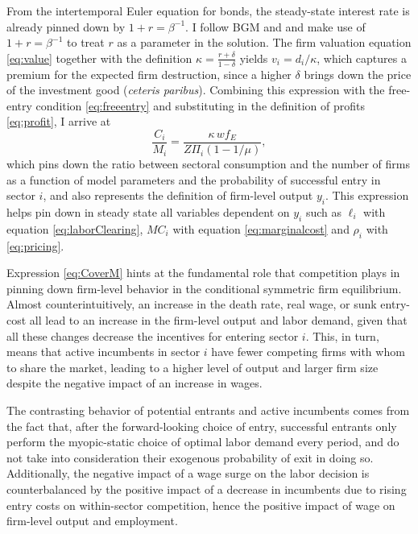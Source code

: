 \documentclass[a4paper,12pt]{article} %
\numberwithin{equation}{section} %
\numberwithin{figure}{section}
\numberwithin{table}{section}
\begin{document}
From the intertemporal Euler equation for bonds, the steady-state interest rate is already pinned down by $1+r = \beta^{-1}$. I follow 
BGM and \textcite{campbell1994inspecting} and make use of $1+r = \beta^{-1}$ to treat $r$ as a parameter in the solution. The firm valuation
equation \eqref{eq:value} together with the definition $\kappa=\frac{r+\delta}{1-\delta}$ yields $v_i = d_i/\kappa$, which captures a premium for
the expected firm destruction, since a higher $\delta$ brings down the price of the investment good (\textit{ceteris paribus}). Combining 
this expression with the free-entry condition \eqref{eq:freeentry} and substituting in the definition of profits \eqref{eq:profit}, I arrive at  
\begin{equation}
  \frac{C_i}{M_i}=\frac{\kappa\,w f_E}{Z\Pi_i(1-1/\mu)}, \label{eq:CoverM}
\end{equation}
which pins down the ratio between sectoral consumption and the number of firms as a function of model parameters and the probability of successful 
entry in sector $i$, and also represents the definition of firm-level output $y_i$. This expression helps pin down in steady state all 
variables dependent on $y_i$ such as $\ell_i$ with equation \eqref{eq:laborClearing}, $MC_i$ with equation \eqref{eq:marginalcost} and 
$\rho_i$ with \eqref{eq:pricing}. 

Expression \eqref{eq:CoverM} hints at the fundamental role that competition plays in pinning down firm-level
behavior in the conditional symmetric firm equilibrium. Almost counterintuitively, an increase in the death rate, real wage, or sunk entry-cost all lead
to an increase in the firm-level output and labor demand, given that all these changes decrease the incentives for entering sector $i$. This, in turn,
means that active incumbents in sector $i$ have fewer competing firms with whom to share the market, leading to a higher level of output and larger
firm size despite the negative impact of an increase in wages. 

The contrasting behavior of potential entrants and active incumbents comes from the fact that, after the forward-looking choice of entry, 
successful entrants only perform the myopic-static choice of optimal labor demand every period, and do not take into consideration their exogenous 
probability of exit in doing so. Additionally, the negative impact of a wage surge on the labor decision is counterbalanced by the 
positive impact of a decrease in incumbents due to rising entry costs on within-sector competition, hence the positive impact of wage on firm-level output 
and employment.
\end{document}
